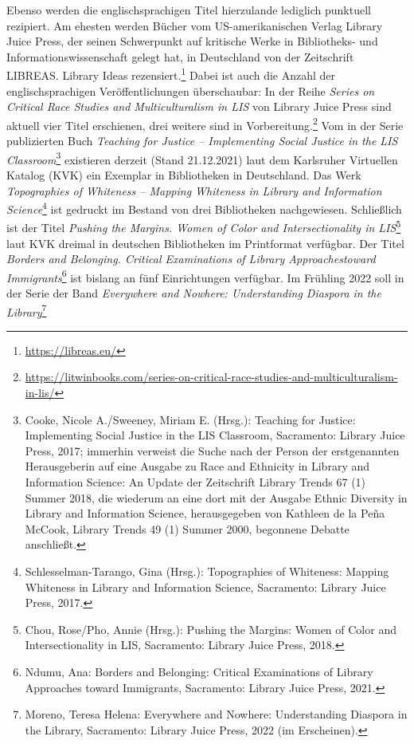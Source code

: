 \documentclass[a4paper,
fontsize=11pt,
oneside,
numbers=noperiodatend,
parskip=half-,
bibliography=totoc,
final
]{scrartcl}
\begin{document}
Ebenso werden die englischsprachigen Titel hierzulande lediglich
punktuell rezipiert. Am ehesten werden Bücher vom US-amerikanischen
Verlag Library Juice Press, der seinen Schwerpunkt auf kritische Werke
in Bibliotheks- und Informationswissenschaft gelegt hat, in Deutschland
von der Zeitschrift LIBREAS. Library Ideas rezensiert.\footnote{\url{https://libreas.eu/}}
Dabei ist auch die Anzahl der englischsprachigen Veröffentlichungen
überschaubar: In der Reihe \emph{Series on Critical Race Studies and
Multiculturalism in LIS} von Library Juice Press sind aktuell vier Titel
erschienen, drei weitere sind in Vorbereitung.\footnote{\url{https://litwinbooks.com/series-on-critical-race-studies-and-multiculturalism-in-lis/}}
Vom in der Serie publizierten Buch \emph{Teaching for Justice --
Implementing Social Justice in the LIS Classroom}\footnote{Cooke, Nicole
  A./Sweeney, Miriam E. (Hrsg.): Teaching for Justice: Implementing
  Social Justice in the LIS Classroom, Sacramento: Library Juice Press,
  2017; immerhin verweist die Suche nach der Person der erstgenannten
  Herausgeberin auf eine Ausgabe zu Race and Ethnicity in Library and
  Information Science: An Update der Zeitschrift Library Trends 67 (1)
  Summer 2018, die wiederum an eine dort mit der Ausgabe Ethnic
  Diversity in Library and Information Science, herausgegeben von
  Kathleen de la Peña McCook, Library Trends 49 (1) Summer 2000,
  begonnene Debatte anschließt.} existieren derzeit (Stand 21.12.2021)
laut dem Karlsruher Virtuellen Katalog (KVK) ein Exemplar in
Bibliotheken in Deutschland. Das Werk \emph{Topographies of Whiteness --
Mapping Whiteness in Library and Information Science}\footnote{Schlesselman-Tarango,
  Gina (Hrsg.): Topographies of Whiteness: Mapping Whiteness in Library
  and Information Science, Sacramento: Library Juice Press, 2017.} ist
gedruckt im Bestand von drei Bibliotheken nachgewiesen. Schließlich ist
der Titel \emph{Pushing the Margins. Women of Color and
Intersectionality in LIS}\footnote{Chou, Rose/Pho, Annie (Hrsg.):
  Pushing the Margins: Women of Color and Intersectionality in LIS,
  Sacramento: Library Juice Press, 2018.} laut KVK dreimal in deutschen
Bibliotheken im Printformat verfügbar. Der Titel \emph{Borders and
Belonging. Critical Examinations of Library Approachestoward
Immigrants}\footnote{Ndumu, Ana: Borders and Belonging: Critical
  Examinations of Library Approaches toward Immigrants, Sacramento:
  Library Juice Press, 2021.} ist bislang an fünf Einrichtungen
verfügbar. Im Frühling 2022 soll in der Serie der Band \emph{Everywhere
and Nowhere: Understanding Diaspora in the Library}\footnote{Moreno,
  Teresa Helena: Everywhere and Nowhere: Understanding Diaspora in the
  Library, Sacramento: Library Juice Press, 2022 (im Erscheinen).}
\end{document}
